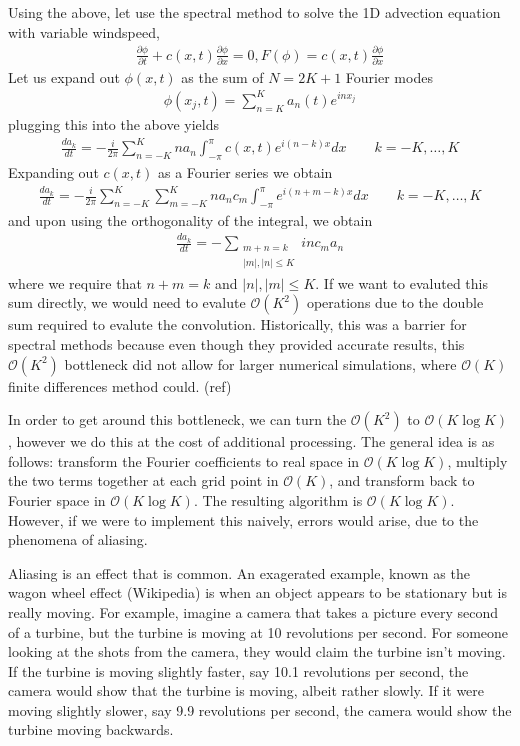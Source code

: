 Using the above, let use the spectral method to solve the 1D advection equation with variable windspeed,
\begin{align}
\frac{\partial\phi}{\partial t} + c(x,t)\frac{\partial \phi}{\partial x} =0, F(\phi) = c(x,t)\frac{\partial \phi}{\partial x}
\end{align}
Let us expand out $\phi(x,t)$ as the sum of $N=2K+1$ Fourier modes
\begin{align}
\phi(x_{j},t)= \sum_{n=K}^{K}a_{n}(t)e^{inx_{j}}
\end{align}
plugging this into the above yields
\begin{align}
\frac{d a_{k}}{dt} = -\frac{i}{2\pi}\sum_{n=-K}^{K}na_{n}\int_{-\pi}^{\pi}c(x,t)e^{i(n-k)x}dx \qquad k=-K,\ldots,K
\end{align}
Expanding out $c(x,t)$ as a Fourier series we obtain
\begin{align} 
\frac{d a_{k}}{dt} = -\frac{i}{2\pi}\sum_{n=-K}^{K}\sum_{m=-K}^{K}na_{n}c_{m}\int_{-\pi}^{\pi}e^{i(n+m-k)x}dx \qquad k=-K,\ldots,K
\end{align}
and upon using the orthogonality of the integral, we obtain
\begin{align}
\frac{da_{k}}{dt} = -\sum_{\substack{m+n=k\\ |m|,|n|\le K}} inc_{m}a_{n}
\end{align}
where we require that $n+m=k$ and $|n|,|m|\le K$. If we want to evaluted this sum directly, we would need to evalute $\mathcal{O}(K^{2})$ operations due to the double sum required to evalute the convolution. Historically, this was a barrier for spectral methods because even though they provided accurate results, this $\mathcal{O}(K^{2})$ bottleneck did not allow for larger numerical simulations, where $\mathcal{O}(K)$ finite differences method could. (ref)

In order to get around this bottleneck, we can turn the $\mathcal{O}(K^{2})$ to $\mathcal{O}(K\log K)$, however we do this at the cost of additional processing. The general idea is as follows: transform the Fourier coefficients to real space in $\mathcal{O}(K\log K)$, multiply the two terms together at each grid point in $\mathcal{O}(K)$, and transform back to Fourier space in $\mathcal{O}(K\log K)$. The resulting algorithm is $\mathcal{O}(K\log K)$. However, if we were to implement this naively, errors would arise, due to the phenomena of aliasing. 

Aliasing is an effect that is common. An exagerated example, known as the wagon wheel effect (Wikipedia) is when an object appears to be stationary but is really moving. For example, imagine a camera that takes a picture every second of a turbine, but the turbine is moving at 10 revolutions per second. For someone looking at the shots from the camera, they would claim the turbine isn't moving. If the turbine is moving slightly faster, say 10.1 revolutions per second, the camera would show that the turbine is moving, albeit rather slowly. If it were moving slightly slower, say 9.9 revolutions per second, the camera would show the turbine moving backwards.


